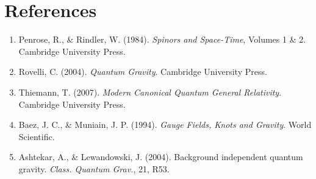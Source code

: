 \documentclass[12pt,a4paper]{article}
\theoremstyle{definition}
\begin{document}
\section*{References}

\begin{enumerate}
    \item Penrose, R., \& Rindler, W. (1984). \emph{Spinors and Space-Time}, Volumes 1 \& 2. Cambridge University Press.
    \item Rovelli, C. (2004). \emph{Quantum Gravity}. Cambridge University Press.
    \item Thiemann, T. (2007). \emph{Modern Canonical Quantum General Relativity}. Cambridge University Press.
    \item Baez, J. C., \& Muniain, J. P. (1994). \emph{Gauge Fields, Knots and Gravity}. World Scientific.
    \item Ashtekar, A., \& Lewandowski, J. (2004). Background independent quantum gravity. \emph{Class. Quantum Grav.}, 21, R53.
\end{enumerate}
\end{document}
